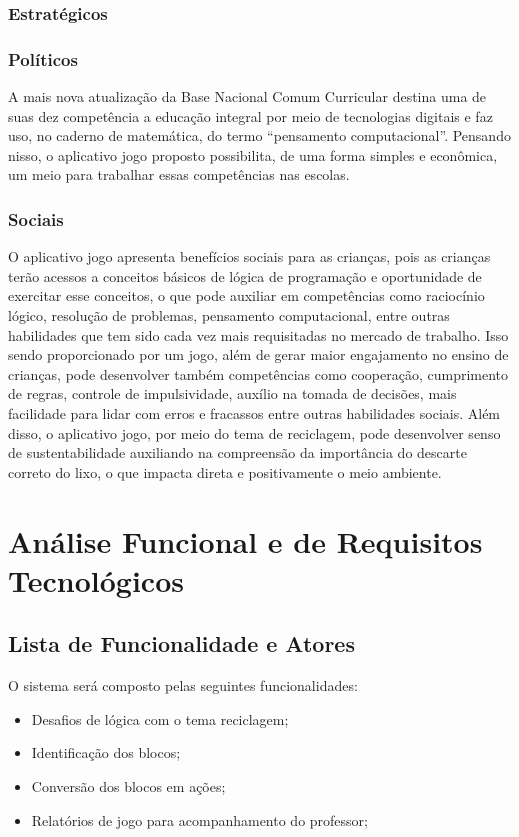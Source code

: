        \subsubsection{Estratégicos}
        
         \subsubsection{Políticos}
A mais nova atualização da Base Nacional Comum Curricular destina uma de suas dez competência a educação integral por meio de tecnologias digitais e faz uso, no caderno de matemática, do termo “pensamento computacional”. Pensando nisso, o aplicativo jogo proposto possibilita, de uma forma simples e econômica, um meio para trabalhar essas competências nas escolas. 
         \subsubsection{Sociais}
O aplicativo jogo apresenta benefícios sociais para as crianças, pois as crianças terão acessos a conceitos básicos de lógica de programação e oportunidade de exercitar esse conceitos, o que pode auxiliar em competências como raciocínio lógico, resolução de problemas, pensamento computacional, entre outras habilidades que tem sido cada vez mais requisitadas no mercado de trabalho. Isso sendo proporcionado por um jogo, além de gerar maior engajamento no ensino de crianças, pode desenvolver  também competências como cooperação, cumprimento de regras, controle de impulsividade, auxílio na tomada de decisões, mais facilidade para lidar com erros e fracassos entre outras habilidades sociais.
Além disso, o aplicativo jogo, por meio do tema de reciclagem, pode desenvolver senso de sustentabilidade auxiliando na compreensão da importância do descarte correto do lixo, o que impacta direta e positivamente  o meio ambiente.

\section{Análise Funcional e de Requisitos Tecnológicos}

    \subsection{Lista de Funcionalidade e Atores}
    O sistema será composto  pelas seguintes funcionalidades:
    \begin{itemize}
        \item Desafios de lógica com o tema reciclagem;
        \item Identificação dos blocos;
        \item Conversão dos blocos em ações;
        \item Relatórios de jogo para acompanhamento do professor;
    \end{itemize}
    
